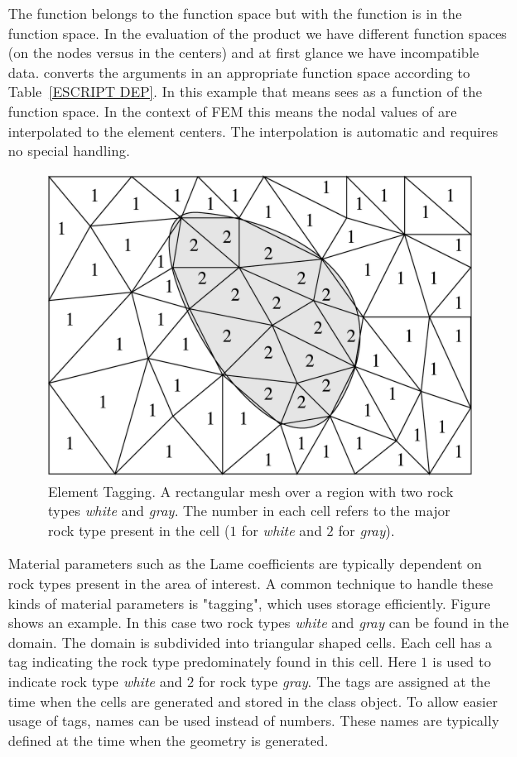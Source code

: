 The function  belongs to the \ContinuousFunction function space
but with  the function  is in the \Function function space.
In the evaluation of the product  we have different function
spaces (on the nodes versus in the centers) and at first glance we have incompatible data.
\escript converts the arguments in an appropriate function space according to
Table~\ref{ESCRIPT DEP}. In this example that means
\escript sees  as a function of the \Function function space. 
In the context of FEM this means the nodal values of 
 are interpolated to the element centers.
The interpolation is automatic and requires no special handling.

\begin{figure}
\includegraphics[width=\textwidth]{figures/EscriptDiagram2}
\caption{\label{Figure: tag}Element Tagging. A rectangular mesh over a region with two rock types {\it white} and {\it gray}.
The number in each cell refers to the major rock type present in the cell ($1$ for {\it white} and $2$ for {\it gray}).
}
\end{figure}

Material parameters such as the Lame coefficients are typically dependent on rock types present in the 
area of interest. A common technique to handle these kinds of material parameters is "tagging", which
uses storage efficiently. Figure 
shows an example. In this case two rock types {\it white} and {\it gray} can be found in the domain. The domain
is subdivided into triangular shaped cells. Each 
cell has a tag indicating the rock type predominately found in this cell. Here $1$ is used to indicate
rock type {\it white} and $2$ for rock type {\it gray}. The tags are assigned at the time when the cells are generated
and stored in the \Domain class object. To allow easier usage of tags, names can be used instead of numbers. These names are typically defined 
at the time when the geometry is generated. 

